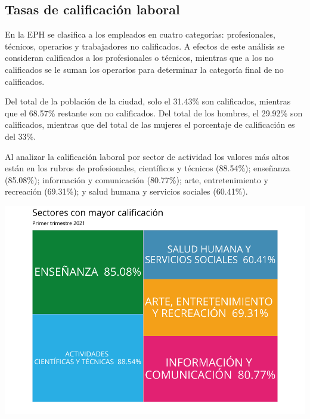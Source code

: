 \documentclass[
]{article}
\begin{document}
\hypertarget{tasas-de-calificaciuxf3n-laboral}{%
\subsection{Tasas de calificación
laboral}\label{tasas-de-calificaciuxf3n-laboral}}

En la EPH se clasifica a los empleados en cuatro categorías:
profesionales, técnicos, operarios y trabajadores no calificados. A
efectos de este análisis se consideran calificados a los profesionales o
técnicos, mientras que a los no calificados se le suman los operarios
para determinar la categoría final de no calificados.

Del total de la población de la ciudad, solo el 31.43\% son calificados,
mientras que el 68.57\% restante son no calificados. Del total de los
hombres, el 29.92\% son calificados, mientras que del total de las
mujeres el porcentaje de calificación es del 33\%.

Al analizar la calificación laboral por sector de actividad los valores
más altos están en los rubros de profesionales, científicos y técnicos
(88.54\%); enseñanza (85.08\%); información y comunicación (80.77\%);
arte, entretenimiento y recreación (69.31\%); y salud humana y servicios
sociales (60.41\%).

\includegraphics{Informe-Mercado-Laboral_files/figure-latex/unnamed-chunk-44-1.pdf}
\end{document}
